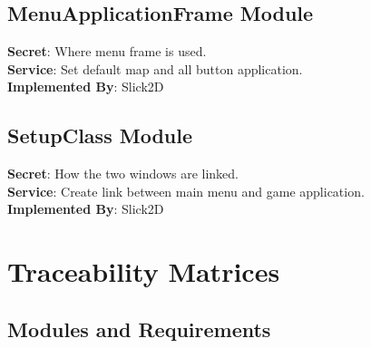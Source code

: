 \documentclass[12,english]{article}
\begin{document}
	\subsection{MenuApplicationFrame Module}
	\textbf{Secret}: Where menu frame is used. \\
	\textbf{Service}: Set default map and all button application.  \\ 
	\textbf{Implemented By}: Slick2D\\
	
	\subsection{SetupClass Module}
	\textbf{Secret}: How the two windows are linked. \\
	\textbf{Service}: Create link between main menu and game application.  \\ 
	\textbf{Implemented By}: Slick2D\\
	
	
\section{Traceability Matrices}

\subsection{Modules and Requirements}
\end{document}
